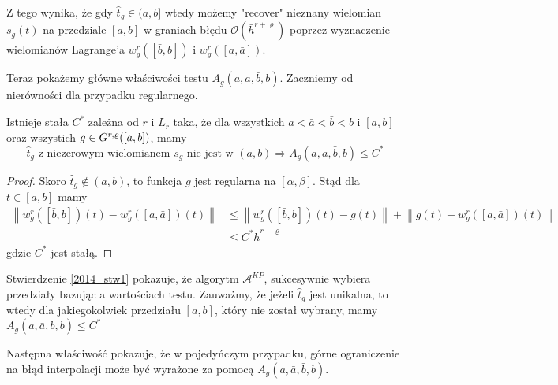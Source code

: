 \documentclass[oik, pdftex, robocza, man]{mgrwms}
\begin{document}
    Z tego wynika, że gdy $\hat{t}_{g} \in (a,b]$ wtedy możemy "recover" nieznany wielomian $s_{g}(t)$ na przedziale $[a,b]$ w graniach błędu $\mathcal{O}(\bar{h}^{r+\varrho})$ poprzez wyznaczenie wielomianów Lagrange'a $w_{g}^{r}([\bar{b}, b])$ i $w_{g}^{r}([a, \bar{a}])$.

    Teraz pokażemy główne właściwości testu $A_{g}(a, \bar{a}, \bar{b}, b)$. Zaczniemy od nierówności dla przypadku regularnego.

    \begin{stw} \label{2014_stw1}
        Istnieje stała $C^{*}$ zależna od $r$ i $L_{r}$ taka, że dla wszystkich $a < \bar{a} < \bar{b} < b$ i $[a,b]$ oraz wszystich $g \in G^{r,\varrho}([a,b])$, mamy
        \begin{equation*}
            \hat{t}_{g} \text{ z niezerowym wielomianem } s_{g} \text{ nie jest w } (a,b) \Longrightarrow A_{g}(a, \bar{a}, \bar{b}, b) \leq C^{*}
        \end{equation*}
    \end{stw}
    \begin{proof}
        Skoro $\hat{t}_{g} \notin (a, b)$, to funkcja $g$ jest regularna na $[\alpha, \beta]$. Stąd dla $t \in[a,b]$ mamy
        \begin{equation*}
            \begin{aligned}
                \left\|w_{g}^{r}([\bar{b}, b])(t)-w_{g}^{r}([a, \bar{a}])(t)\right\| & \leq\left\|w_{g}^{r}([\bar{b}, b])(t)-g(t)\right\|+\left\|g(t)-w_{g}^{r}([a, \bar{a}])(t)\right\| \\
                & \leq C^{*} \bar{h}^{r+\varrho}
            \end{aligned}
        \end{equation*}
    gdzie $C^{*}$ jest stałą.
    \end{proof}

    \begin{uw}
        Stwierdzenie \eqref{2014_stw1} pokazuje, że algorytm $\mathcal{A}^{KP}$, sukcesywnie wybiera przedziały bazując a wartościach testu. Zauważmy, że jeżeli $\hat{t}_{g}$ jest unikalna, to wtedy dla jakiegokolwiek przedziału $[a,b]$, który nie został wybrany, mamy $A_{g}(a, \bar{a}, \bar{b}, b) \leq C^{*}$
    \end{uw}

    Następna właściwość pokazuje, że w pojedyńczym przypadku, górne ograniczenie na błąd interpolacji może być wyrażone za pomocą $A_{g}(a, \bar{a}, \bar{b}, b)$.
\end{document}
